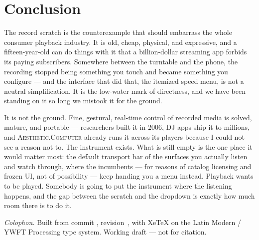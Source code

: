 \documentclass[10pt,letterpaper,twocolumn]{article}
\newcommand{\ac}{\textsc{Aesthetic.Computer}}
\begin{document}
\section{Conclusion}

The record scratch is the counterexample that should embarrass the whole consumer playback industry. It is old, cheap, physical, and expressive, and a fifteen-year-old can do things with it that a billion-dollar streaming app forbids its paying subscribers. Somewhere between the turntable and the phone, the recording stopped being something you touch and became something you configure --- and the interface that did that, the itemized speed menu, is not a neutral simplification. It is the low-water mark of directness, and we have been standing on it so long we mistook it for the ground.

It is not the ground. Fine, gestural, real-time control of recorded media is solved, mature, and portable --- researchers built it in 2006, DJ apps ship it to millions, and \ac{} already runs it across its players because I could not see a reason not to. The instrument exists. What is still empty is the one place it would matter most: the default transport bar of the surfaces you actually listen and watch through, where the incumbents --- for reasons of catalog licensing and frozen UI, not of possibility --- keep handing you a menu instead. Playback wants to be played. Somebody is going to put the instrument where the listening happens, and the gap between the scratch and the dropdown is exactly how much room there is to do it.

\vspace{1em}
{\footnotesize\color{acgray}\noindent\textit{Colophon.} Built from commit \texttt{\paperhash}, revision~\paperrev, with \mbox{Xe\TeX} on the Latin Modern / YWFT Processing type system. Working draft --- not for citation.\par\paperhistory}



\end{document}

